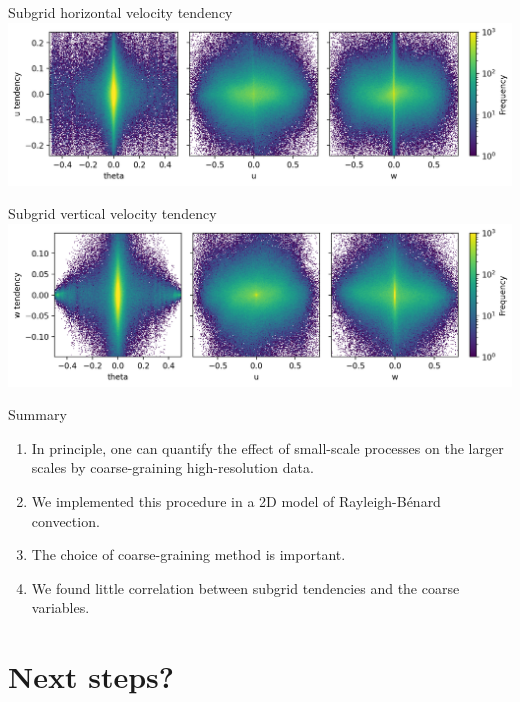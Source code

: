 \documentclass[12pt, aspectratio=169]{beamer}
\newcommand{\rb}{Rayleigh-B\'{e}nard}
\begin{document}
\begin{frame}{Subgrid horizontal velocity tendency}
\centering
\includegraphics[width=\linewidth]{figures/u_tend.png}
\end{frame}

\begin{frame}{Subgrid vertical velocity tendency}
\centering
\includegraphics[width=\linewidth]{figures/w_tend.png}
\end{frame}

\begin{frame}{Summary}
\begin{enumerate}
    \itemsep=2em
    \item In principle, one can quantify the effect of small-scale
        processes on the larger scales by coarse-graining high-resolution data.
    \item We implemented this procedure in a 2D model of \rb{} convection.
    \item The choice of coarse-graining method is important.
    \item We found little correlation between subgrid tendencies and the
        coarse variables.
\end{enumerate}
\end{frame}

\section{Next steps?}
\end{document}
